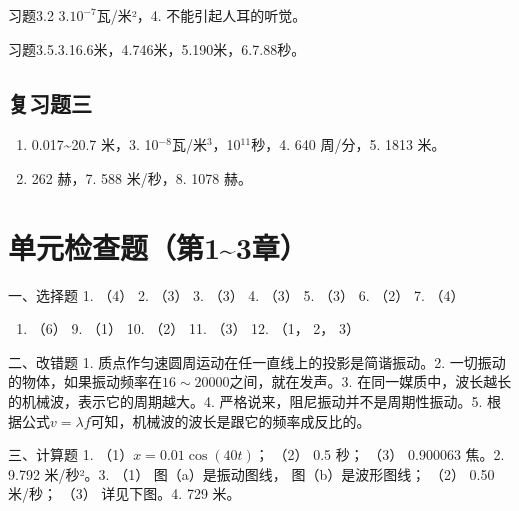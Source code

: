 习题3.2 3.\(10^{-7}\)瓦/米²，4. 不能引起人耳的听觉。

习题3.5.3.16.6米，4.746米，5.190米，6.7.88秒。

\subsection{复习题三}\label{ux590dux4e60ux9898ux4e09-1}

\begin{enumerate}
\def\labelenumi{\arabic{enumi}.}
\item
  0.017\textasciitilde20.7 米，3.
  10\(^{-8}\)瓦/米\(^{3}\)，10\(^{11}\)秒，4. 640 周/分，5. 1813 米。
\item
  262 赫，7. 588 米/秒，8. 1078 赫。
\end{enumerate}

\section{单元检查题（第1\textasciitilde3章）}\label{ux5355ux5143ux68c0ux67e5ux9898ux7b2c13ux7ae0}

一、选择题 1. （4） 2. （3） 3. （3） 4. （3） 5. （3） 6. （2） 7.
（4）

\begin{enumerate}
\def\labelenumi{\arabic{enumi}.}
\setcounter{enumi}{7}
\tightlist
\item
  （6） 9. （1） 10. （2） 11. （3） 12. （1， 2， 3）
\end{enumerate}

二、改错题 1. 质点作匀速圆周运动在任一直线上的投影是简谐振动。2.
一切振动的物体，如果振动频率在\(16 \sim 20000\)之间，就在发声。3.
在同一媒质中，波长越长的机械波，表示它的周期越大。4.
严格说来，阻尼振动并不是周期性振动。5.
根据公式\(v = \lambda f\)可知，机械波的波长是跟它的频率成反比的。

三、计算题 1. （1）\(x = 0.01\cos (40t)\)； （2） 0.5 秒； （3）
0.900063 焦。2. 9.792 米/秒²。3. （1） 图（a）是振动图线，
图（b）是波形图线； （2） 0.50 米/秒； （3） 详见下图。4. 729 米。

